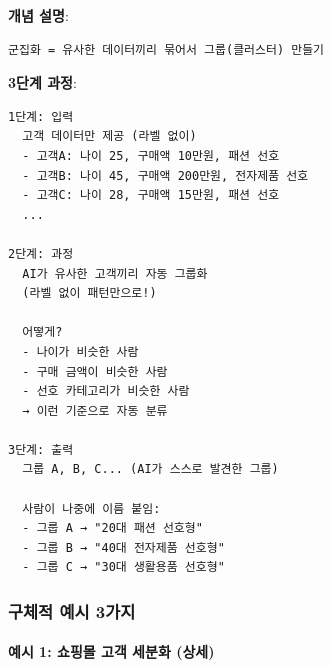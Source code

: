 \documentclass[a4paper, 11pt]{article}
\begin{document}
\textbf{개념 설명}:

\begin{verbatim}
군집화 = 유사한 데이터끼리 묶어서 그룹(클러스터) 만들기
\end{verbatim}

\textbf{3단계 과정}:

\begin{verbatim}
1단계: 입력
  고객 데이터만 제공 (라벨 없이)
  - 고객A: 나이 25, 구매액 10만원, 패션 선호
  - 고객B: 나이 45, 구매액 200만원, 전자제품 선호
  - 고객C: 나이 28, 구매액 15만원, 패션 선호
  ...

2단계: 과정
  AI가 유사한 고객끼리 자동 그룹화
  (라벨 없이 패턴만으로!)
  
  어떻게?
  - 나이가 비슷한 사람
  - 구매 금액이 비슷한 사람
  - 선호 카테고리가 비슷한 사람
  → 이런 기준으로 자동 분류

3단계: 출력
  그룹 A, B, C... (AI가 스스로 발견한 그룹)
  
  사람이 나중에 이름 붙임:
  - 그룹 A → "20대 패션 선호형"
  - 그룹 B → "40대 전자제품 선호형"
  - 그룹 C → "30대 생활용품 선호형"
\end{verbatim}

\hypertarget{uxad6cuxccb4uxc801-uxc608uxc2dc-3uxac00uxc9c0}{%
\subsubsection{구체적 예시
3가지}\label{uxad6cuxccb4uxc801-uxc608uxc2dc-3uxac00uxc9c0}}

\hypertarget{uxc608uxc2dc-1-uxc1fcuxd551uxbab0-uxace0uxac1d-uxc138uxbd84uxd654-uxc0c1uxc138}{%
\paragraph{예시 1: 쇼핑몰 고객 세분화
(상세)}\label{uxc608uxc2dc-1-uxc1fcuxd551uxbab0-uxace0uxac1d-uxc138uxbd84uxd654-uxc0c1uxc138}}
\end{document}
